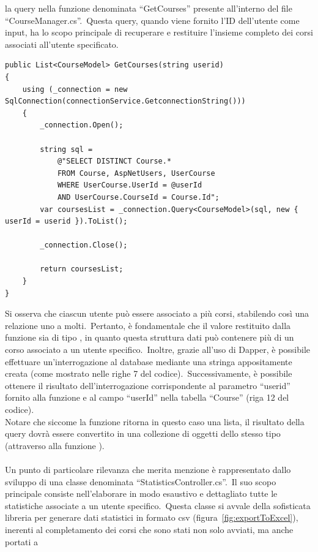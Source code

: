 la query nella funzione denominata ``GetCourses'' presente all'interno del file ``CourseManager.cs''.\ Questa query, 
quando viene fornito l'ID dell'utente come input, ha lo scopo principale di recuperare e restituire 
l'insieme completo dei corsi associati all'utente specificato.
%
\begin{lstlisting}[style=cs_style, caption=esempio funzione per l'esecuzione di una query da codice tramite il framework Dapper]
public List<CourseModel> GetCourses(string userid)
{
	using (_connection = new SqlConnection(connectionService.GetconnectionString()))
	{
		_connection.Open();

		string sql = 
			@"SELECT DISTINCT Course.* 
			FROM Course, AspNetUsers, UserCourse 
			WHERE UserCourse.UserId = @userId     
			AND UserCourse.CourseId = Course.Id";
		var coursesList = _connection.Query<CourseModel>(sql, new { userId = userid }).ToList();

		_connection.Close();

		return coursesList;
	}
} 
\end{lstlisting}
%
Si osserva che ciascun utente può essere associato a più corsi, 
stabilendo così una relazione uno a molti.\ Pertanto, è fondamentale 
che il valore restituito dalla funzione sia di tipo , 
in quanto questa struttura dati può contenere più di un corso associato a 
un utente specifico.\ Inoltre, grazie all'uso di Dapper, è possibile effettuare 
un'interrogazione al database mediante una stringa appositamente creata 
(come mostrato nelle righe 7 del codice).\ Successivamente, è possibile 
ottenere il risultato dell'interrogazione corrispondente al parametro ``userid'' 
fornito alla funzione e al campo ``userId'' nella tabella ``Course'' (riga 12 del codice).
\\
Notare che siccome la funzione ritorna in questo caso una lista, il risultato della query
dovrà essere convertito in una collezione di oggetti dello stesso tipo (attraverso alla funzione ).
%
\\ \\
%
Un punto di particolare rilevanza che merita menzione è rappresentato dallo sviluppo di una classe denominata 
``StatisticsController.cs''.\ Il suo scopo principale consiste nell'elaborare in modo esaustivo e dettagliato tutte 
le statistiche associate a un utente specifico.\ Questa classe si avvale della sofisticata libreria  
per generare dati statistici in formato csv (figura~\ref{fig:exportToExcel}), inerenti al completamento dei corsi che sono stati non solo avviati, ma anche portati a 
